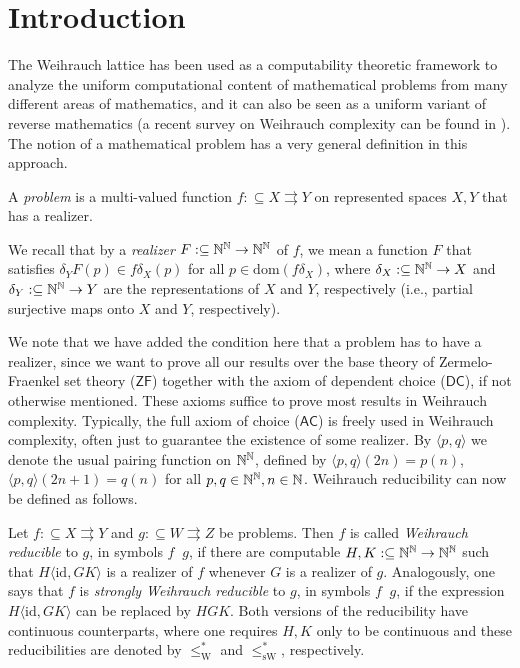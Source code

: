 \documentclass{amsart}
\def\IN{{\Bbb{N}}}
\def\In{\subseteq}
\def\mto{\rightrightarrows}
\def\leqW{\mathop{\leq_{\mathrm{W}}}}
\def\leqSW{\mathop{\leq_{\mathrm{sW}}}}
\def\leqW{\mathop{\leq_{\mathrm{W}}}}
\def\leqSW{\mathop{\leq_{\mathrm{sW}}}}
\def\id{{\mathrm{id}}}
\def\dom{{\mathrm{dom}}}
\def\AC{\mathsf{AC}}
\def\ZF{\mathsf{ZF}}
\def\DC{\mathsf{DC}}
\begin{document}
\setcounter{tocdepth}{1}
\tableofcontents

\section{Introduction}

The Weihrauch lattice has been used as a computability theoretic framework to analyze the uniform computational
content of mathematical problems from many different areas of mathematics, and it can also be seen as a uniform variant
of reverse mathematics (a recent survey on Weihrauch complexity can be found in \cite{BGP21}). 
The notion of a mathematical problem has a very general definition in this approach.

\begin{definition}[Problems]
\label{def:problem}
A {\em problem} is a multi-valued function $f:\In X\mto Y$ on represented spaces
$X,Y$ that has a realizer.
\end{definition}

We recall that by a {\em realizer} $F:\In\IN^\IN\to\IN^\IN$ of $f$, we mean a function $F$ that satisfies
$\delta_YF(p)\in f\delta_X(p)$ for all $p\in\dom(f\delta_X)$, where $\delta_X:\In\IN^\IN\to X$ and ${\delta_Y:\In\IN^\IN\to Y}$
are the representations of $X$ and $Y$, respectively (i.e., partial surjective maps onto $X$ and $Y$, respectively).

We note that we have added the condition here that a problem has to have a realizer, since
we want to prove all our results over the base theory of 
Zermelo-Fraenkel set theory ($\ZF$) together with the axiom of dependent choice ($\DC$), if not otherwise mentioned.
These axioms suffice to prove most results in Weihrauch complexity. Typically, the full axiom of choice ($\AC$)
is freely used in Weihrauch complexity, often just to guarantee the existence of some realizer.
By $\langle p,q\rangle$ we denote the usual
pairing function on $\IN^\IN$, defined by $\langle p,q\rangle(2n)=p(n)$, $\langle p,q\rangle(2n+1)=q(n)$
for all $p,q\in\IN^\IN,n\in\IN$.
Weihrauch reducibility can now be defined as follows. 

\begin{definition}
Let $f:\In X\mto Y$ and $g:\In W\mto Z$ be problems. Then $f$ is called {\em Weihrauch reducible}
to $g$, in symbols $f\leqW g$, if there are computable $H,K:\In\IN^\IN\to\IN^\IN$ such that
$H\langle \id,GK\rangle$ is a realizer of $f$ whenever $G$ is a realizer of $g$.
Analogously, one says that $f$ is {\em strongly Weihrauch reducible} to $g$, in symbols $f\leqSW g$, if the expression $H\langle \id,GK\rangle$
can be replaced by $HGK$. Both versions of the reducibility have continuous counterparts,
where one requires $H,K$ only to be continuous and these reducibilities are denoted by $\leq_\mathrm{W}^*$ and $\leq_\mathrm{sW}^*$,
respectively.
\end{definition}
\end{document}
